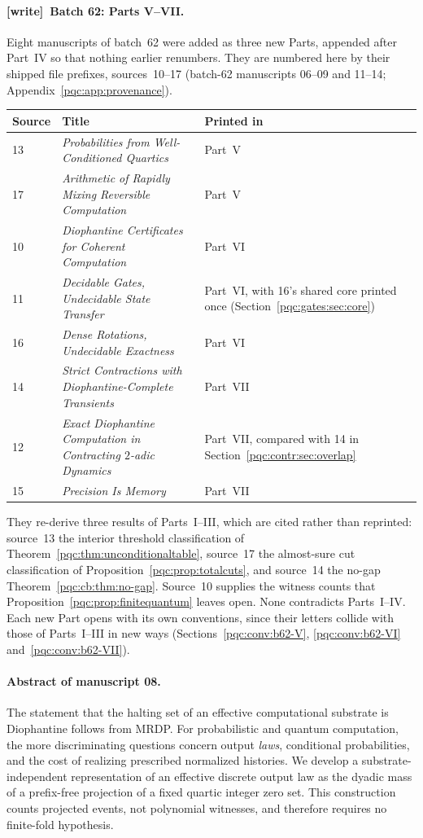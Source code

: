 \documentclass[11pt,letterpaper]{article}
\numberwithin{equation}{section}
\theoremstyle{definition}
\theoremstyle{remark}
\newcommand{\wtag}{\textup{[write]}}
\begin{document}
\paragraph{\wtag\ Batch 62: Parts V--VII.}
Eight manuscripts of batch~62 were added as three new Parts, appended after
Part~IV so that nothing earlier renumbers. They are numbered here by their
shipped file prefixes, sources~10--17 (batch-62 manuscripts 06--09 and 11--14;
Appendix~\ref{pqc:app:provenance}).
\begin{center}
\small
\begin{tabular}{@{}p{}p{}p{}@{}}
\toprule
Source & Title & Printed in\\
\midrule
13 & \emph{Probabilities from Well-Conditioned Quartics} & Part~V\\
17 & \emph{Arithmetic of Rapidly Mixing Reversible Computation} & Part~V\\
10 & \emph{Diophantine Certificates for Coherent Computation} & Part~VI\\
11 & \emph{Decidable Gates, Undecidable State Transfer} & Part~VI, with 16's shared core printed once (Section~\ref{pqc:gates:sec:core})\\
16 & \emph{Dense Rotations, Undecidable Exactness} & Part~VI\\
14 & \emph{Strict Contractions with Diophantine-Complete Transients} & Part~VII\\
12 & \emph{Exact Diophantine Computation in Contracting $2$-adic Dynamics} & Part~VII, compared with 14 in Section~\ref{pqc:contr:sec:overlap}\\
15 & \emph{Precision Is Memory} & Part~VII\\
\bottomrule
\end{tabular}
\end{center}
They re-derive three results of Parts~I--III, which are cited rather than
reprinted: source~13 the interior threshold classification of
Theorem~\ref{pqc:thm:unconditionaltable}, source~17 the almost-sure cut
classification of Proposition~\ref{pqc:prop:totalcuts}, and source~14 the
no-gap Theorem~\ref{pqc:cb:thm:no-gap}. Source~10 supplies the witness counts
that Proposition~\ref{pqc:prop:finitequantum} leaves open. None contradicts
Parts~I--IV. Each new Part opens with its own conventions, since their letters
collide with those of Parts~I--III in new ways
(Sections~\ref{pqc:conv:b62-V}, \ref{pqc:conv:b62-VI}
and~\ref{pqc:conv:b62-VII}).

\paragraph{Abstract of manuscript 08.}
The statement that the halting set of an effective computational substrate is
Diophantine follows from MRDP. For probabilistic and quantum computation, the
more discriminating questions concern output \emph{laws}, conditional
probabilities, and the cost of realizing prescribed normalized histories.
We develop a substrate-independent representation of an effective discrete
output law as the dyadic mass of a prefix-free projection of a fixed quartic
integer zero set. This construction counts projected events, not polynomial
witnesses, and therefore requires no finite-fold hypothesis.
\end{document}
